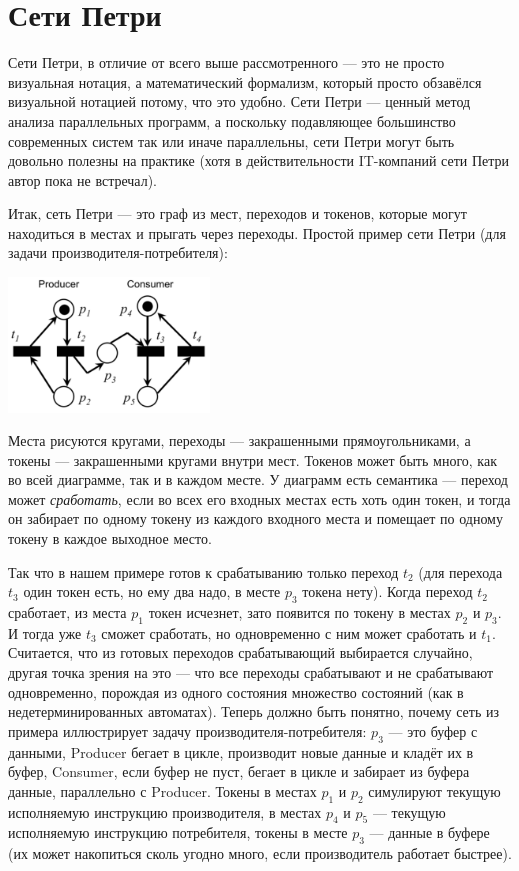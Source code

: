 \documentclass{../mcstext}
\begin{document}
\section{Сети Петри}

Сети Петри, в отличие от всего выше рассмотренного --- это не просто визуальная нотация, а математический формализм, который просто обзавёлся визуальной нотацией потому, что это удобно. Сети Петри --- ценный метод анализа параллельных программ, а поскольку подавляющее большинство современных систем так или иначе параллельны, сети Петри могут быть довольно полезны на практике (хотя в действительности IT-компаний сети Петри автор пока не встречал).

Итак, сеть Петри --- это граф из мест, переходов и токенов, которые могут находиться в местах и прыгать через переходы. Простой пример сети Петри (для задачи производителя-потребителя):

\begin{center}
    \includegraphics[width=0.4\textwidth]{petri.png}
\end{center}

Места рисуются кругами, переходы --- закрашенными прямоугольниками, а токены --- закрашенными кругами внутри мест. Токенов может быть много, как во всей диаграмме, так и в каждом месте. У диаграмм есть семантика --- переход может \textit{сработать}, если во всех его входных местах есть хоть один токен, и тогда он забирает по одному токену из каждого входного места и помещает по одному токену в каждое выходное место. 

Так что в нашем примере готов к срабатыванию только переход $t_2$ (для перехода $t_3$ один токен есть, но ему два надо, в месте $p_3$ токена нету). Когда переход $t_2$ сработает, из места $p_1$ токен исчезнет, зато появится по токену в местах $p_2$ и $p_3$. И тогда уже $t_3$ сможет сработать, но одновременно с ним может сработать и $t_1$. Считается, что из готовых переходов срабатывающий выбирается случайно, другая точка зрения на это --- что все переходы срабатывают и не срабатывают одновременно, порождая из одного состояния множество состояний (как в недетерминированных автоматах). Теперь должно быть понятно, почему сеть из примера иллюстрирует задачу производителя-потребителя: $p_3$ --- это буфер с данными, Producer бегает в цикле, производит новые данные и кладёт их в буфер, Consumer, если буфер не пуст, бегает в цикле и забирает из буфера данные, параллельно с Producer. Токены в местах $p_1$ и $p_2$ симулируют текущую исполняемую инструкцию производителя, в местах $p_4$ и $p_5$ --- текущую исполняемую инструкцию потребителя, токены в месте $p_3$ --- данные в буфере (их может накопиться сколь угодно много, если производитель работает быстрее).
\end{document}
